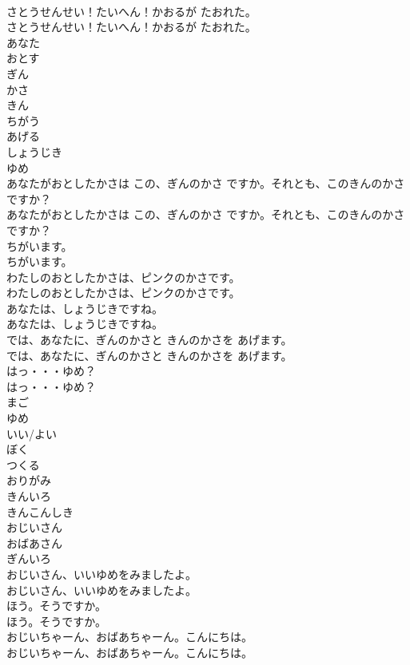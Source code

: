 \documentclass[8pt]{extreport}
\begin{document}
\begin{CJK}{UTF8}{min}
\\	さとうせんせい！たいへん！かおるが たおれた。
\\	さとうせんせい！たいへん！かおるが たおれた。
\\	あなた
\\	おとす
\\	ぎん
\\	かさ
\\	きん
\\	ちがう
\\	あげる
\\	しょうじき
\\	ゆめ
\\	あなたがおとしたかさは この、ぎんのかさ ですか。それとも、このきんのかさ ですか？
\\	あなたがおとしたかさは この、ぎんのかさ ですか。それとも、このきんのかさ ですか？
\\	ちがいます。
\\	ちがいます。
\\	わたしのおとしたかさは、ピンクのかさです。
\\	わたしのおとしたかさは、ピンクのかさです。
\\	あなたは、しょうじきですね。
\\	あなたは、しょうじきですね。
\\	では、あなたに、ぎんのかさと  きんのかさを  あげます。
\\	では、あなたに、ぎんのかさと  きんのかさを  あげます。
\\	はっ・・・ゆめ？
\\	はっ・・・ゆめ？
\\	まご
\\	ゆめ
\\	いい/よい
\\	ぼく
\\	つくる
\\	おりがみ
\\	きんいろ
\\	きんこんしき
\\	おじいさん
\\	おばあさん
\\	ぎんいろ
\\	おじいさん、いいゆめをみましたよ。
\\	おじいさん、いいゆめをみましたよ。
\\	ほう。そうですか。
\\	ほう。そうですか。
\\	おじいちゃーん、おばあちゃーん。こんにちは。
\\	おじいちゃーん、おばあちゃーん。こんにちは。

\end{CJK}
\end{document}
